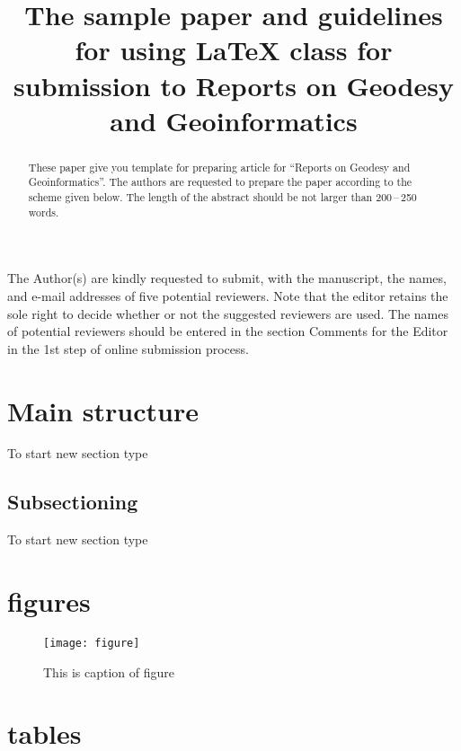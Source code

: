 \documentclass{rog}
\title{The sample paper and guidelines for using \LaTeX{} class for submission to Reports on Geodesy and Geoinformatics}
\begin{document}
    \maketitle

    \begin{abstract}
      These paper give you template for preparing article for ``Reports on 
      Geodesy and Geoinformatics''. The authors are requested to prepare the 
      paper according to the scheme given below. The length of the abstract 
      should be not larger than 200\,–\,250 words.
    \end{abstract}

    The Author(s) are kindly requested to submit, with the manuscript, 
    the names, and e-mail addresses of five potential reviewers. Note 
    that the editor retains the sole right to decide whether or not the 
    suggested reviewers are used. The names of potential reviewers should 
    be entered in the section Comments for the Editor in the 1st step of 
    online submission process.
    \cite{hw1997}

    \blindtext[10]

  \section{Main structure}
    To start new section type 
  \subsection{Subsectioning}
    To start new section type 

  \section{figures}
    \begin{figure}
      \texttt{[image: figure]}
      \caption{This is caption of figure}
    \end{figure}

  \section{tables}
\end{document}
